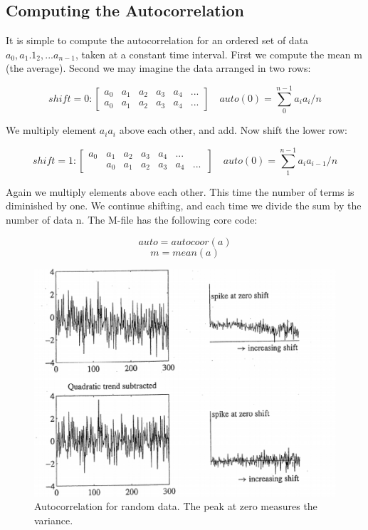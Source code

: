  \subsection{Computing the Autocorrelation }
 
 It is simple to compute the autocorrelation for an ordered set of data $ a_{0},a_{1}.1_{2},...a_{n-1} $, taken at a constant time interval. First we compute the mean m (the average). Second we may imagine the data arranged in two rows: 
 
 \[ shift = 0:\begin{bmatrix}
 a_{0}&a_{1}&a_{2}&a_{3}&a_{4}&...\\ a_{0}&a_{1}&a_{2}&a_{3}&a_{4}&...
 \end{bmatrix}\quad auto(0)=\sum_{0}^{n-1}a_{i}a_{i}/n \] 
 
 We multiply element $ a_{i}a_{i} $ above each other, and add. Now shift the lower row:
 
 \[ shift = 1:\begin{bmatrix}
 a_{0}&a_{1}&a_{2}&a_{3}&a_{4}&...&\quad\\ \quad&a_{0}&a_{1}&a_{2}&a_{3}&a_{4}&...
 \end{bmatrix}\quad auto(0)=\sum_{1}^{n-1}a_{i}a_{i-1}/n \] 
 
 Again we multiply elements above each other. This time the number of terms is diminished by one. We continue shifting, and each time we divide the sum by the number of data n. The M-file has the following core code: 
 
 \[ auto=autocoor(a) \]
 \[ m=mean(a) \]
 
 \begin{figure}[h]
 	\centering
 	\includegraphics[width=0.7\linewidth]{TeX_files/Part02/chapter05/image/4}
 	\caption{Autocorrelation for random data. The peak at zero measures the variance.}
 	\label{ }
 \end{figure}
 
